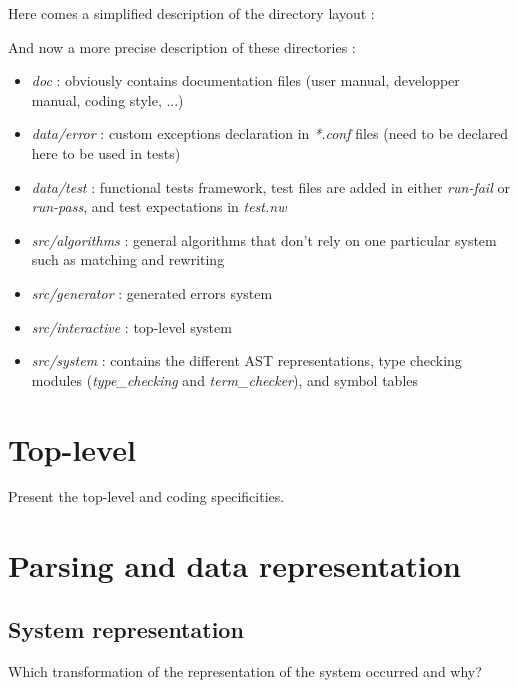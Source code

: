 \documentclass[12pt,a4paper]{article}
\begin{document}
Here comes a simplified description of the directory layout :
\bigskip

\bigskip

And now a more precise description of these directories :

\begin{itemize}

\item \emph{doc} : obviously contains documentation files (user manual, developper manual, coding style, ...)
\item \emph{data/error} : custom exceptions declaration in \emph{*.conf} files (need to be declared here to be used in tests)
\item \emph{data/test} : functional tests framework, test files are added in either \emph{run-fail} or \emph{run-pass}, and test expectations in \emph{test.nw}
\item \emph{src/algorithms} : general algorithms that don't rely on one particular system such as matching and rewriting
\item \emph{src/generator} : generated errors system
\item \emph{src/interactive} : top-level system
\item \emph{src/system} : contains the different AST representations, type checking modules (\emph{type\_checking} and \emph{term\_checker}), and symbol tables

\end{itemize}

\section{Top-level}
\label{top-level}
Present the top-level and coding specificities.

\section{Parsing and data representation}
\label{data}

\subsection{System representation}
\label{data-system}
Which transformation of the representation of the system occurred and why?
\end{document}
